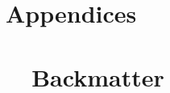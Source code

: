 \documentclass[10pt]{newsiambook}
\begin{document}
\part{Appendices}
\appendix





\part{\ \ Backmatter}
\backmatter
%
%
%
%



\printindex
\end{document}
